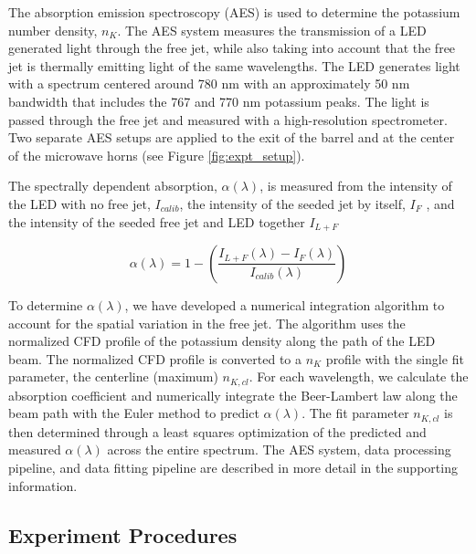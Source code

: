 The absorption emission spectroscopy (AES) is used to determine the potassium number density, $n_K$. The AES system measures the transmission of a LED generated light through the free jet, while also taking into account that the free jet is thermally emitting light of the same wavelengths. The LED generates light with a spectrum centered around 780 nm with an approximately 50 nm bandwidth that includes the 767 and 770 nm potassium peaks. The light is passed through the free jet and measured with a high-resolution spectrometer. Two separate AES setups are applied to the exit of the barrel and at the center of the microwave horns (see Figure \ref{fig:expt_setup}).

The spectrally dependent absorption, $\alpha(\lambda)$, is measured from the intensity of the LED with no free jet, $I_{calib}$, the intensity of the seeded jet by itself, $I_F$ , and the intensity of the seeded free jet and LED together $I_{L+F}$

\begin{equation}
    \label{eq:absorption_def}
    \alpha(\lambda) = 1 - \left(\frac{I_{L+F}(\lambda) - I_{F}(\lambda)}{I_{calib}(\lambda)}\right)
\end{equation}


To determine $\alpha(\lambda)$, we have developed a numerical integration algorithm to account for the spatial variation in the free jet. The algorithm uses the normalized CFD profile of the potassium density along the path of the LED beam. The normalized CFD profile is converted to a $n_K$ profile with the single fit parameter, the centerline (maximum) $n_{K, cl}$. For each wavelength, we calculate the absorption coefficient and numerically integrate the Beer-Lambert law along the beam path with the Euler method to predict $\alpha(\lambda)$. The fit parameter $n_{K,cl}$ is then determined through a least squares optimization of the predicted and measured $\alpha(\lambda)$ across the entire spectrum.  The AES system, data processing pipeline, and data fitting pipeline are described in more detail in the supporting information. 

\subsection{Experiment Procedures}


